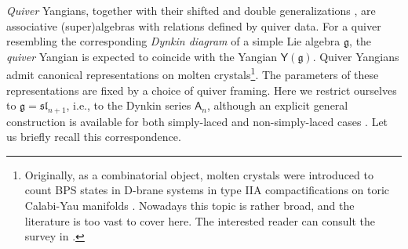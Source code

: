 \documentclass[10pt]{article}
\theoremstyle{definition}
\def\fg{\mathfrak{g}}
\def\fl{\mathfrak{l}}
\def\fs{\mathfrak{s}}
\def\fs{\mathfrak{s}}
\def\myA{{\mathsf{A}}}
\def\myY{{\mathsf{Y}}}
\numberwithin{equation}{section}
\begin{document}
\emph{Quiver} Yangians,  together with their shifted and double generalizations \cite{Li:2020rij,Galakhov:2021xum,Noshita:2021dgj,Li:2023zub,Bao:2025hfu}, are associative (super)algebras with relations defined by quiver data.
For a quiver resembling the corresponding \emph{Dynkin diagram} of a simple Lie algebra $\fg$, the \emph{quiver} Yangian is expected to coincide with the Yangian $\myY(\fg)$.
Quiver Yangians admit canonical representations on molten crystals\footnote{
	Originally, as a combinatorial object, molten crystals were introduced to count BPS states in D-brane systems in type IIA compactifications on toric Calabi-Yau manifolds \cite{Okounkov:2003sp,Ooguri:2009ijd}.
	Nowadays this topic is rather broad,  and the literature is too vast to cover here.
	The interested reader can consult the survey in \cite{Bao:2024ygr}.
}.
The parameters of these representations are fixed by a choice of quiver framing.
Here we restrict ourselves to $\fg=\fs\fl_{n+1}$, i.e., to the Dynkin series $\myA_n$, although an explicit general construction is available for both simply-laced and non-simply-laced cases \cite{Cecotti:2012gh,Bao:2025hfu,Chen:2025xoe,Gavshin:2025akn,Galakhov:2026cwv}.
Let us briefly recall this correspondence.
\end{document}
